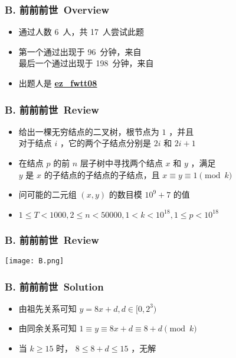 \documentclass[notheorems]{beamer}
\newcommand{\zhProbB}{前前前世}		\newcommand{\AuthProbB}{\textbf{\underline{\href{http://codeforces.com/profile/EZ_fwtt08}{ez\_fwtt08}}}}
\newcommand{\AccInProbB}{6}	\newcommand{\SubInProbB}{17}	\newcommand{\RatInProbB}{35.29\%}
\newcommand{\FirPenInProbB}{96}		\newcommand{\FirPerInProbB}{\NONE}
\newcommand{\LasPenInProbB}{198}	\newcommand{\LasPerInProbB}{\NONE}
\begin{document}
\begin{frame}[label = ProbB]
\frametitle{B. \zhProbB\ Overview}
\begin{spacing}{2.0} \large
\begin{itemize}[<+->]
\item 通过人数 \AccInProbB\ 人，共 \SubInProbB\ 人尝试此题
\item 第一个通过出现于 \FirPenInProbB\ 分钟，来自 \FirPerInProbB\ 
\\ 最后一个通过出现于 \LasPenInProbB\ 分钟，来自 \LasPerInProbB\ 
\item 出题人是 \AuthProbB\ 
\end{itemize}
\end{spacing}
\end{frame}
\begin{frame}
\frametitle{B. \zhProbB\ Review}
\begin{spacing}{2.0} \large
\begin{itemize}[<+->]
\item 给出一棵无穷结点的二叉树，根节点为 $1$ ，并且 \\ 对于结点 $i$ ，它的两个子结点分别是 $2 i$ 和 $2 i + 1$
\item 在结点 $p$ 的前 $n$ 层子树中寻找两个结点 $x$ 和 $y$ ，满足 \\ $y$ 是 $x$ 的\alert{子结点的子结点的子结点}，且 \alert{$x \equiv y \equiv 1 \pmod{k}$}
\item 问可能的二元组 $(x, y)$ 的数目模 $10^9 + 7$ 的值
\item $1 \leq T < 1000, 2 \leq n < 50000, 1 < k < 10^{18}, 1 \leq p < 10^{18}$
\end{itemize}
\end{spacing}
\end{frame}
\begin{frame}
\frametitle{B. \zhProbB\ Review}
\begin{center}
\texttt{[image: B.png]}
\end{center}
\end{frame}
\begin{frame}
\frametitle{B. \zhProbB\ Solution}
\begin{spacing}{2.0} \large
\begin{itemize}[<+->]
\item 由祖先关系可知 $y = 8 x + d, d \in [0, 2^3)$
\item 由同余关系可知 $1 \equiv y \equiv 8 x + d \equiv 8 + d \pmod{k}$
\item 当 $k \geq 15$ 时， $8 \leq 8 + d \leq 15$ ，\alert{无解}
\end{itemize}
\end{spacing}
\end{frame}
\end{document}
